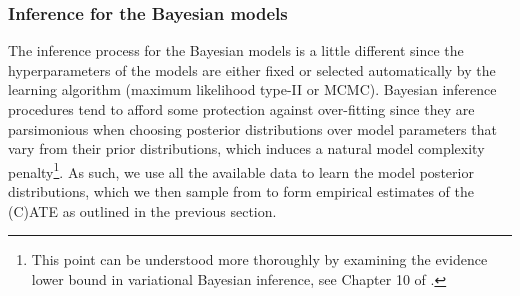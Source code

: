 \documentclass[12pt, a4paper]{article}
\begin{document}
%


\subsubsection*{Inference for the Bayesian models}

The inference process for the Bayesian models is a little different since the
hyperparameters of the models are either fixed or selected automatically by the
learning algorithm (maximum likelihood type-II or MCMC). Bayesian inference
procedures tend to afford some protection against over-fitting since they are
parsimonious when choosing posterior distributions over model parameters that
vary from their prior distributions, which induces a natural model complexity
penalty\footnote{This point can be understood more thoroughly by examining the
evidence lower bound in variational Bayesian inference, see Chapter 10 of
\citet{bishop2006}.}. As such, we use all the available data to learn the model
posterior distributions, which we then sample from to form empirical estimates
of the (C)ATE as outlined in the previous section. 
\end{document}
